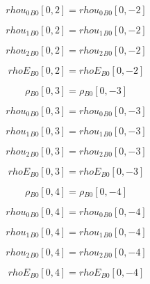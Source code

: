 \documentclass{article}
\begin{document}
\begin{dmath}{rhou_{0}{_{B0}}}[{0,2}] = {rhou_{0}{_{B0}}}[{0,-2}]\end{dmath}

\begin{dmath}{rhou_{1}{_{B0}}}[{0,2}] = {rhou_{1}{_{B0}}}[{0,-2}]\end{dmath}

\begin{dmath}{rhou_{2}{_{B0}}}[{0,2}] = {rhou_{2}{_{B0}}}[{0,-2}]\end{dmath}

\begin{dmath}{rhoE{_{B0}}}[{0,2}] = {rhoE{_{B0}}}[{0,-2}]\end{dmath}

\begin{dmath}{\rho{_{B0}}}[{0,3}] = {\rho{_{B0}}}[{0,-3}]\end{dmath}

\begin{dmath}{rhou_{0}{_{B0}}}[{0,3}] = {rhou_{0}{_{B0}}}[{0,-3}]\end{dmath}

\begin{dmath}{rhou_{1}{_{B0}}}[{0,3}] = {rhou_{1}{_{B0}}}[{0,-3}]\end{dmath}

\begin{dmath}{rhou_{2}{_{B0}}}[{0,3}] = {rhou_{2}{_{B0}}}[{0,-3}]\end{dmath}

\begin{dmath}{rhoE{_{B0}}}[{0,3}] = {rhoE{_{B0}}}[{0,-3}]\end{dmath}

\begin{dmath}{\rho{_{B0}}}[{0,4}] = {\rho{_{B0}}}[{0,-4}]\end{dmath}

\begin{dmath}{rhou_{0}{_{B0}}}[{0,4}] = {rhou_{0}{_{B0}}}[{0,-4}]\end{dmath}

\begin{dmath}{rhou_{1}{_{B0}}}[{0,4}] = {rhou_{1}{_{B0}}}[{0,-4}]\end{dmath}

\begin{dmath}{rhou_{2}{_{B0}}}[{0,4}] = {rhou_{2}{_{B0}}}[{0,-4}]\end{dmath}

\begin{dmath}{rhoE{_{B0}}}[{0,4}] = {rhoE{_{B0}}}[{0,-4}]\end{dmath}
\end{document}
